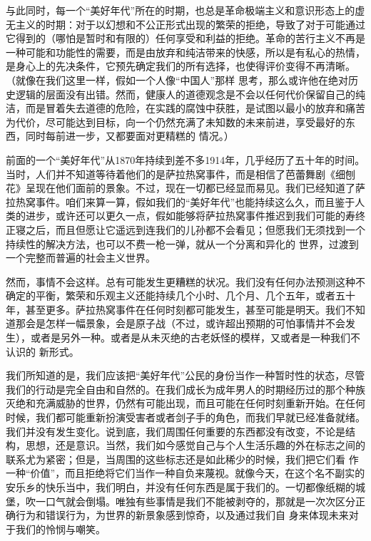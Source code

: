 \documentclass{article}
\begin{document}
与此同时，每一个“美好年代”所在的时期，也总是革命极端主义和意识形态上的虚无主义的时期：对于以幻想和不公正形式出现的繁荣的拒绝，导致了对于可能通过它得到的（哪怕是暂时和有限的）任何享受和利益的拒绝。革命的苦行主义不再是一种可能和功能性的需要，而是由放弃和纯洁带来的快感，所以是有私心的热情，是身心上的先决条件，它预先确定我们的所有选择，也使得评价变得不再清晰。（就像在我们这里一样，假如一个人像“中国人”那样
\newpage
思考，那么或许他在绝对历史逻辑的层面没有出错。然而，健康人的道德观念是不会以任何代价保留自己的纯洁，而是冒着失去道德的危险，在实践的腐蚀中获胜，是试图以最小的放弃和痛苦为代价，尽可能达到目标，向一个仍然充满了未知数的未来前进，享受最好的东西，同时每前进一步，又都要面对更精糕的
情况。） 

前面的一个“美好年代”从1870年持续到差不多1914年，几乎经历了五十年的时间。当时，人们并不知道等待着他们的是萨拉热窝事件，而是相信了芭蕾舞剧《细刨花》呈现在他们面前的景象。不过，现在一切都已经显而易见。我们已经知道了萨拉热窝事件。咱们来算一算，假如我们的“美好年代”也能持续这么久，而且鉴于人类的进步，或许还可以更久一点，假如能够将萨拉热窝事件推迟到我们可能的寿终正寝之后，而且但愿让它遥远到连我们的儿孙都不会看见；但愿我们无须找到一个持续性的解决方法，也可以不费一枪一弹，就从一个分离和异化的
世界，过渡到一个完整而普遍的社会主义世界。 

\newpage

然而，事情不会这样。总有可能发生更糟糕的状况。我们没有任何办法预测这种不确定的平衡，繁荣和乐观主义还能持续几个小时、几个月、几个五年，或者五十年，甚至更多。萨拉热窝事件在任何时刻都可能发生，甚至可能是明天。我们不知道那会是怎样一幅景象，会是原子战（不过，或许超出预期的可怕事情并不会发生），或者是另外一种。或者是从未灭绝的古老妖怪的模样，又或者是一种我们不认识的
新形式。 

我们所知道的是，我们应该把“美好年代”公民的身份当作一种暂时性的状态，尽管我们的行动是完全自由和自然的。在我们成长为成年男人的时期经历过的那个种族灭绝和充满威胁的世界，仍然有可能出现，而且可能在任何时刻重新开始。在任何时候，我们都可能重新扮演受害者或者剑子手的角色，而我们早就已经准备就绪。我们并没有发生变化。说到底，我们周围任何重要的东西都没有改变，不论是结构，思想，还是意识。当然，我们如今感觉自己与个人生活乐趣的外在标志之间的联系尤为紧密；但是，当周围的这些标志还是如此稀少的时候，我们把它们看
\newpage
作一种“价值”，而且拒绝将它们当作一种自负来蔑视。就像今天，在这个名不副实的安乐乡的快乐当中，我们明白，并没有任何东西是属于我们的。一切都像纸糊的城堡，吹一口气就会倒塌。唯独有些事情是我们不能被剥夺的，那就是一次次区分正确行为和错误行为，为世界的新景象感到惊奇，以及通过我们自
身来体现未来对于我们的怜悯与嘲笑。 
\end{document}
